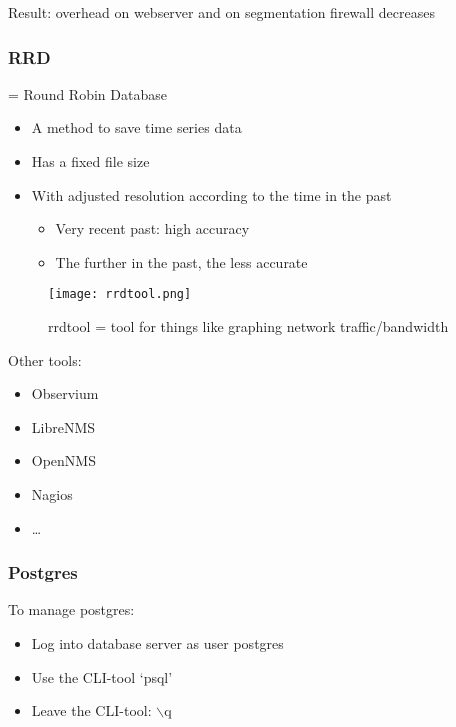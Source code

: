 \documentclass{article}
\begin{document}
Result: overhead on webserver and on segmentation firewall decreases

\subsubsection{RRD}

= Round Robin Database

\begin{itemize}
    \item A method to save time series data
    \item Has a fixed file size
    \item With adjusted resolution according to the time in the past
    \begin{itemize}
        \item Very recent past: high accuracy
        \item The further in the past, the less accurate
    \end{itemize} 
\end{itemize}



\begin{figure}[H]
    \centering
    \texttt{[image: rrdtool.png]}
    \caption{rrdtool = tool for things like graphing network traffic/bandwidth}
\end{figure}

Other tools:

\begin{itemize}
    \item Observium
    \item LibreNMS
    \item OpenNMS
    \item Nagios
    \item \dots
\end{itemize}

\subsubsection{Postgres}

To manage postgres:

\begin{itemize}
    \item Log into database server as user postgres
    \item Use the CLI-tool `psql'
    \item Leave the CLI-tool: $\backslash$q
\end{itemize}
\end{document}
